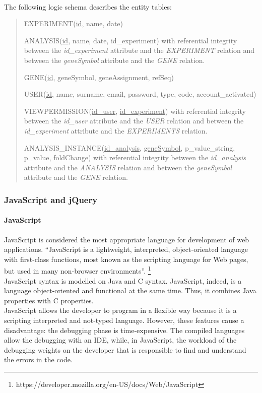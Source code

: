 \documentclass[a4paper]{report}
\begin{document}
\paragraph{}The following logic schema describes the entity tables:
\begin{quote}
\item EXPERIMENT(\underline{id}, name, date) 
\item ANALYSIS(\underline{id}, name, date, id\_experiment) with referential integrity between the \emph{id\_experiment} attribute and the \emph{EXPERIMENT} relation and between the \emph{geneSymbol} attribute and the \emph{GENE} relation.
\item GENE(\underline{id}, geneSymbol, geneAssignment, refSeq) 
\item USER(\underline{id}, name, surname, email, password, type, code, account\_activated) 
\item VIEWPERMISSION(\underline{id\_user}, \underline{id\_experiment})  with referential integrity between the \emph{id\_user} attribute and the \emph{USER} relation and between the \emph{id\_experiment} attribute and the \emph{EXPERIMENTS} relation.
\item ANALYSIS\_INSTANCE(\underline{id\_analysis}, \underline{geneSymbol}, p\_value\_string, p\_value, foldChange) with referential integrity between the \emph{id\_analysis} attribute and the \emph{ANALYSIS} relation and between the \emph{geneSymbol} attribute and the \emph{GENE} relation.

\end{quote}

\subsubsection{JavaScript and jQuery}

\paragraph{JavaScript}
JavaScript is considered the most appropriate language for development of web applications.
 ``JavaScript is a lightweight, interpreted, object-oriented language with first-class functions, most known as the scripting language for Web pages, but used in many non-browser environments''. \footnote{https://developer.mozilla.org/en-US/docs/Web/JavaScript}\\
JavaScript syntax is modelled on Java and C syntax. JavaScript, indeed, is a language object-oriented and functional at the same time. Thus, it combines Java properties with C properties.\\
JavaScript allows the developer to program in a flexible way because it is a scripting interpreted and not-typed language. However, these features cause a disadvantage: the debugging phase is time-expensive. The compiled languages allow the debugging with an IDE, while, in JavaScript, the workload of the debugging weights on the developer that is responsible to find and understand the errors in the code.
\end{document}
